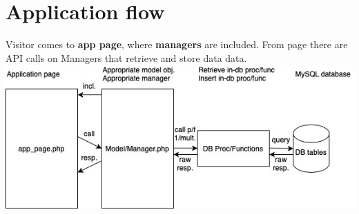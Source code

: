 \section{Application flow}
Visitor comes to \textbf{app page}, where \textbf{managers} are included. From page there are API calls on Managers that retrieve and store data data.
\newline
\includegraphics[scale=0.707]{img/app-schema.jpg}
